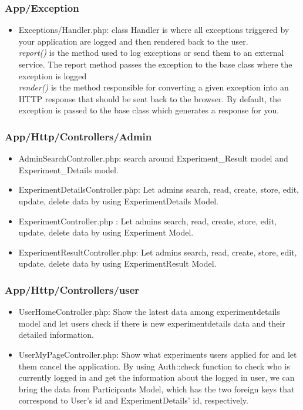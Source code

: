 \documentclass[letterpaper, 10 pt, conference]{ieeeconf}  %
\begin{document}
\subsubsection{App/Exception\\}
\begin{itemize}
    \item Exceptions/Handler.php: class Handler is where all exceptions triggered by your application are logged and then rendered back to the user.
    \\\textit{report()} is the method used to log exceptions or send them to an external service. The report method passes the exception to the base class where the exception is logged
    \\\textit{render()} is the method responsible for converting a given exception into an HTTP response that should be sent back to the browser. By default, the exception is passed to the base class which generates a response for you.\\
\end{itemize}
\subsubsection{App/Http/Controllers/Admin\\}




\begin{itemize}
    \item AdminSearchController.php: search around Experiment\_Result model and Experiment\_Details model.
    \item ExperimentDetailsController.php: Let admins search, read, create, store, edit, update, delete data by using ExperimentDetails Model.
    \item ExperimentController.php : Let admins search, read, create, store, edit, update, delete data by using Experiment Model.
    \item ExperimentResultController.php: Let admins search, read, create, store, edit, update, delete data by using ExperimentResult Model.\\
\end{itemize}
\subsubsection{App/Http/Controllers/user\\}
\begin{itemize}
    \item UserHomeController.php: Show the latest data among experimentdetails model and let users check if there is new experimentdetails data and their detailed information.
    \item UserMyPageController.php: Show what experiments users applied for and let them cancel the application. By using Auth::check function to check who is currently logged in and get the information about the logged in user, we can bring the data from Participants Model, which has the two foreign keys that correspond to User’s id and ExperimentDetails’ id, respectively.\\
\end{itemize}
\end{document}
